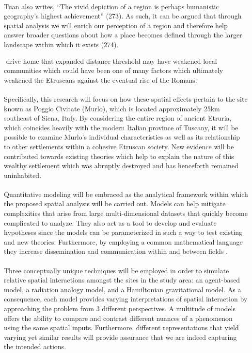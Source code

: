 \documentclass[12pt,a4paper]{thesis}
\begin{document}
\paragraph{}
Tuan also writes, ``The vivid depiction of a region is perhaps humanistic geography's highest achievement'' (273). As such, it can be argued that through spatial analysis we will enrich our perception of a region and therefore help answer broader questions about how a place becomes defined through the larger landscape within which it exists (274).

-drive home that expanded distance threshold may have weakened local communities which could have been one of many factors which ultimately weakened the Etruscans against the eventual rise of the Romans.

\paragraph{} 
Specifically, this research will focus on how these spatial effects  pertain to the site known as Poggio Civitate (Murlo), which is located approximately 25km southeast of Siena, Italy. By considering the entire region of ancient Etruria, which coincides heavily with the modern Italian province of Tuscany, it will be possible to examine Murlo's individual characteristics as well as its relationship to other settlements within a cohesive Etruscan society. New evidence will be contributed towards existing theories which help to explain the nature of this wealthy settlement which was abruptly destroyed and has henceforth remained uninhabited.

\paragraph{}
Quantitative modeling will be embraced as the analytical framework within which the proposed spatial 
analysis will be carried out. Models can help mitigate complexities that arise from large multi-dimensional datasets that quickly become complicated to analyze. They also act as a tool to develop and evaluate hypotheses since the models can be parameterized in such a way to test existing and new theories. Furthermore, by employing a common mathematical language they increase dissemination and communication within and between fields \citep{Wyl09}. 


\paragraph{}
Three conceptually unique techniques will be employed in order to simulate relative spatial interactions amongst the sites in the study area: an agent-based model, a radiation analogy model, and a Hamiltonian gravitational model. As a consequence, each model provides varying interpretations of spatial interaction by approaching the problem from 3 different perspectives. A multitude of models offers the ability to compare and contrast different nuances of a phenomenon using the same spatial inputs. Furthermore, different representations that yield varying yet similar results will provide assurance that we are indeed capturing the intended actions. 
\end{document}
